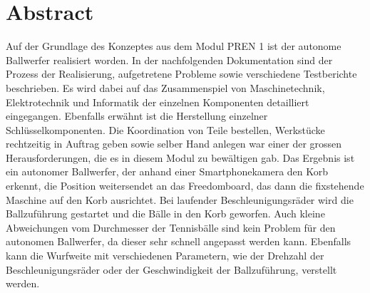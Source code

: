 
\section*{Abstract}
Auf der Grundlage des Konzeptes aus dem Modul PREN 1 ist der autonome Ballwerfer realisiert worden. In der nachfolgenden Dokumentation sind der Prozess der Realisierung, aufgetretene Probleme sowie verschiedene Testberichte beschrieben. Es wird dabei auf das Zusammenspiel von Maschinetechnik, Elektrotechnik und Informatik der einzelnen Komponenten detailliert eingegangen. Ebenfalls erwähnt ist die Herstellung einzelner Schlüsselkomponenten. Die Koordination von Teile bestellen, Werkstücke rechtzeitig in Auftrag geben sowie selber Hand anlegen war einer der grossen Herausforderungen, die es in diesem Modul zu bewältigen gab. Das Ergebnis ist ein autonomer Ballwerfer, der anhand einer Smartphonekamera den Korb erkennt, die Position weitersendet an das Freedomboard, das dann die fixstehende Maschine auf den Korb ausrichtet. Bei laufender Beschleunigungsräder wird die Ballzuführung gestartet und die Bälle in den Korb geworfen. Auch kleine Abweichungen vom Durchmesser der Tennisbälle sind kein Problem für den autonomen Ballwerfer, da dieser sehr schnell angepasst werden kann. Ebenfalls kann die Wurfweite mit verschiedenen Parametern, wie der Drehzahl der Beschleunigungsräder oder der Geschwindigkeit der Ballzuführung, verstellt werden.

